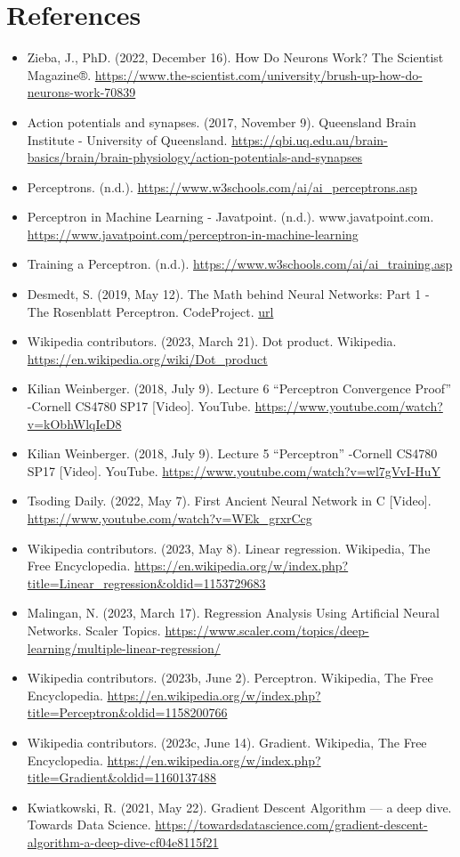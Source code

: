 \documentclass[12pt]{book}
\begin{document}
\chapter{References}
\begin{itemize}
\item Zieba, J., PhD. (2022, December 16). How Do Neurons Work? The Scientist Magazine®.
  \url{https://www.the-scientist.com/university/brush-up-how-do-neurons-work-70839}
\item Action potentials and synapses. (2017, November 9). Queensland Brain Institute - University
  of Queensland.
  \url{https://qbi.uq.edu.au/brain-basics/brain/brain-physiology/action-potentials-and-synapses}
\item Perceptrons. (n.d.). \url{https://www.w3schools.com/ai/ai_perceptrons.asp}
\item Perceptron in Machine Learning - Javatpoint. (n.d.). www.javatpoint.com.
  \url{https://www.javatpoint.com/perceptron-in-machine-learning}
\item Training a Perceptron. (n.d.). \url{https://www.w3schools.com/ai/ai_training.asp}
\item Desmedt, S. (2019, May 12). The Math behind Neural Networks: Part 1 - The Rosenblatt Perceptron.
  CodeProject.
  \href{https://www.codeproject.com/Articles/4047091/The-Math-behind-Neural-Networks-Part-1-The-Rosenbl}{
    url}
\item Wikipedia contributors. (2023, March 21). Dot product. Wikipedia.
  \url{https://en.wikipedia.org/wiki/Dot_product}
\item Kilian Weinberger. (2018, July 9). Lecture 6 “Perceptron Convergence Proof” -Cornell
  CS4780 SP17 [Video]. YouTube. \url{https://www.youtube.com/watch?v=kObhWlqIeD8}
\item Kilian Weinberger. (2018, July 9). Lecture 5 “Perceptron” -Cornell
  CS4780 SP17 [Video]. YouTube. \url{https://www.youtube.com/watch?v=wl7gVvI-HuY}
\item Tsoding Daily. (2022, May 7).
  First Ancient Neural Network in C [Video]. \url{https://www.youtube.com/watch?v=WEk_grxrCcg}
\item Wikipedia contributors. (2023, May 8). Linear regression. Wikipedia, The Free Encyclopedia.
  \url{https://en.wikipedia.org/w/index.php?title=Linear_regression&oldid=1153729683}
\item Malingan, N. (2023, March 17). Regression Analysis Using Artificial Neural Networks. Scaler Topics.
  \url{https://www.scaler.com/topics/deep-learning/multiple-linear-regression/}
\item Wikipedia contributors. (2023b, June 2). Perceptron. Wikipedia, The Free Encyclopedia.
  \url{https://en.wikipedia.org/w/index.php?title=Perceptron&oldid=1158200766}
\item Wikipedia contributors. (2023c, June 14). Gradient. Wikipedia, The Free Encyclopedia.
  \url{https://en.wikipedia.org/w/index.php?title=Gradient&oldid=1160137488}
\item Kwiatkowski, R. (2021, May 22). Gradient Descent Algorithm — a deep dive. Towards Data Science.
  \url{https://towardsdatascience.com/gradient-descent-algorithm-a-deep-dive-cf04e8115f21}


\end{itemize}
\end{document}

